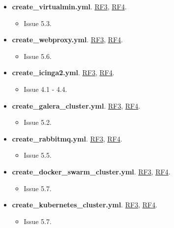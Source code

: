 \begin{text}
\begin{text}
\begin{itemize}
		\item \textbf{create\_virtualmin.yml}. \hyperref[RF3]{RF3}, \hyperref[RF4]{RF4}.
		\begin{itemize}
			\item Issue 5.3.
		\end{itemize}
	
		\item \textbf{create\_webproxy.yml}. \hyperref[RF3]{RF3}, \hyperref[RF4]{RF4}.
		\begin{itemize}
			\item Issue 5.6.
		\end{itemize}
	
		\item \textbf{create\_icinga2.yml}. \hyperref[RF3]{RF3}, \hyperref[RF4]{RF4}.
		\begin{itemize}
			\item Issue 4.1 - 4.4.
		\end{itemize}
	
		\item \textbf{create\_galera\_cluster.yml}. \hyperref[RF3]{RF3}, \hyperref[RF4]{RF4}.
		\begin{itemize}
			\item Issue 5.2.
		\end{itemize}
	
		\item \textbf{create\_rabbitmq.yml}. \hyperref[RF3]{RF3}, \hyperref[RF4]{RF4}.
		\begin{itemize}
			\item Issue 5.5.
		\end{itemize}
	
		\item \textbf{create\_docker\_swarm\_cluster.yml}. \hyperref[RF3]{RF3}, \hyperref[RF4]{RF4}.
		\begin{itemize}
			\item Issue 5.7.
		\end{itemize}
		\item \textbf{create\_kubernetes\_cluster.yml}. \hyperref[RF3]{RF3}, \hyperref[RF4]{RF4}.
		\begin{itemize}
			\item Issue 5.7.
		\end{itemize}
		
	\end{itemize}

	\end{text}
\end{text}

